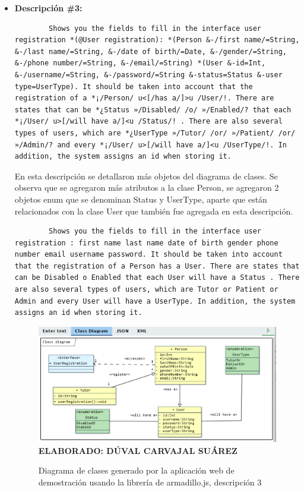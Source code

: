 \begin{itemize}
	\item \textbf{Descripción \#3:}
	\begin{lstlisting}
		Shows you the fields to fill in the interface user registration *(@User registration): *(Person &-/first name/=String, &-/last name/=String, &-/date of birth/=Date, &-/gender/=String, &-/phone number/=String, &-/email/=String) *(User &-id=Int, &-/username/=String, &-/password/=String &-status=Status &-user type=UserType). It should be taken into account that the registration of a *¡/Person/ u<[/has a/]>u /User/!. There are states that can be *¿Status »/Disabled/ /o/ »/Enabled/? that each *¡/User/ u>[/will have a/]<u /Status/! . There are also several types of users, which are *¿UserType »/Tutor/ /or/ »/Patient/ /or/ »/Admin/? and every *¡/User/ u>[/will have a/]<u /UserType/!. In addition, the system assigns an id when storing it. \end{lstlisting}
	
		En esta descripción se detallaron más objetos del diagrama de clases. Se observa que se agregaron más atributos a la clase Person, se agregaron 2 objetos enum que se denominan Status y UserType, aparte que están relacionados con la clase User que también fue agregada en esta descripción.
		
		\begin{lstlisting}
		Shows you the fields to fill in the interface user registration : first name last name date of birth gender phone number email username password. It should be taken into account that the registration of a Person has a User. There are states that can be Disabled o Enabled that each User will have a Status . There are also several types of users, which are Tutor or Patient or Admin and every User will have a UserType. In addition, the system assigns an id when storing it. \end{lstlisting}

	\begin{figure}[h!]
		\caption{Diagrama de clases generado por la aplicación web de demostración usando la librería de armadillo.js, descripción 3}
		\includegraphics[width=15cm]{img/prueba03.png}
		\label{fig:prueba03}
		\textbf{\\ ELABORADO: DÚVAL CARVAJAL SUÁREZ}
	\end{figure}


\end{itemize}
